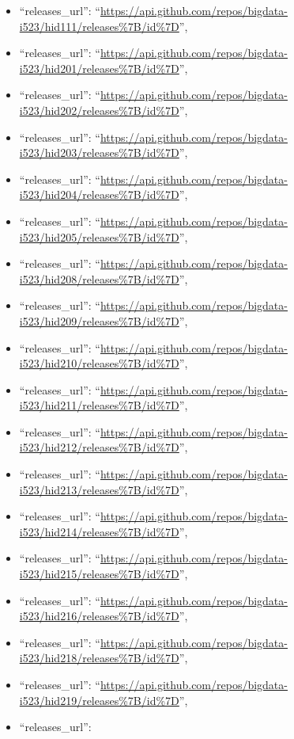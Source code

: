 \begin{itemize}
\item
  ``releases\_url'':
  ``\url{https://api.github.com/repos/bigdata-i523/hid111/releases\%7B/id\%7D}'',
\item
  ``releases\_url'':
  ``\url{https://api.github.com/repos/bigdata-i523/hid201/releases\%7B/id\%7D}'',
\item
  ``releases\_url'':
  ``\url{https://api.github.com/repos/bigdata-i523/hid202/releases\%7B/id\%7D}'',
\item
  ``releases\_url'':
  ``\url{https://api.github.com/repos/bigdata-i523/hid203/releases\%7B/id\%7D}'',
\item
  ``releases\_url'':
  ``\url{https://api.github.com/repos/bigdata-i523/hid204/releases\%7B/id\%7D}'',
\item
  ``releases\_url'':
  ``\url{https://api.github.com/repos/bigdata-i523/hid205/releases\%7B/id\%7D}'',
\item
  ``releases\_url'':
  ``\url{https://api.github.com/repos/bigdata-i523/hid208/releases\%7B/id\%7D}'',
\item
  ``releases\_url'':
  ``\url{https://api.github.com/repos/bigdata-i523/hid209/releases\%7B/id\%7D}'',
\item
  ``releases\_url'':
  ``\url{https://api.github.com/repos/bigdata-i523/hid210/releases\%7B/id\%7D}'',
\item
  ``releases\_url'':
  ``\url{https://api.github.com/repos/bigdata-i523/hid211/releases\%7B/id\%7D}'',
\item
  ``releases\_url'':
  ``\url{https://api.github.com/repos/bigdata-i523/hid212/releases\%7B/id\%7D}'',
\item
  ``releases\_url'':
  ``\url{https://api.github.com/repos/bigdata-i523/hid213/releases\%7B/id\%7D}'',
\item
  ``releases\_url'':
  ``\url{https://api.github.com/repos/bigdata-i523/hid214/releases\%7B/id\%7D}'',
\item
  ``releases\_url'':
  ``\url{https://api.github.com/repos/bigdata-i523/hid215/releases\%7B/id\%7D}'',
\item
  ``releases\_url'':
  ``\url{https://api.github.com/repos/bigdata-i523/hid216/releases\%7B/id\%7D}'',
\item
  ``releases\_url'':
  ``\url{https://api.github.com/repos/bigdata-i523/hid218/releases\%7B/id\%7D}'',
\item
  ``releases\_url'':
  ``\url{https://api.github.com/repos/bigdata-i523/hid219/releases\%7B/id\%7D}'',
\item
  ``releases\_url'':

\end{itemize}
